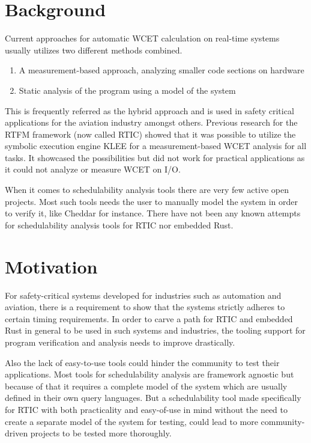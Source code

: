 \section{Background}
Current approaches for automatic WCET calculation on real-time systems usually
utilizes two different methods combined.
\begin{enumerate}
    \item A measurement-based approach, analyzing smaller code sections on hardware
    \item Static analysis of the program using a model of the system
\end{enumerate}
This is frequently referred as the hybrid approach and is used in safety
critical applications for the aviation industry\cite{rapita} amongst others.
Previous research for the RTFM framework (now called RTIC) showed that it was
possible to utilize the symbolic execution engine KLEE for a measurement-based
WCET analysis for all tasks\cite{lindner}. It showcased the possibilities but
did not work for practical applications as it could not analyze or measure WCET
on I/O.

When it comes to schedulability analysis tools there are very few active open
projects. Most such tools needs the user to manually model the system in order
to verify it, like Cheddar\cite{cheddar} for instance. There have not been any
known attempts for schedulability analysis tools for RTIC nor embedded Rust.

\section{Motivation}
For safety-critical systems developed for industries such as automation and
aviation, there is a requirement to show that the systems strictly adheres to
certain timing requirements. In order to carve a path for RTIC and embedded
Rust in general to be used in such systems and industries, the tooling support
for program verification and analysis needs to improve drastically.

Also the lack of easy-to-use tools could hinder the community to test their
applications. Most tools for schedulability analysis are framework agnostic but
because of that it requires a complete model of the system which are usually
defined in their own query languages. But a schedulability tool made
specifically for RTIC with both practicality and easy-of-use in mind without
the need to create a separate model of the system for testing, could lead to
more community-driven projects to be tested more thoroughly.

